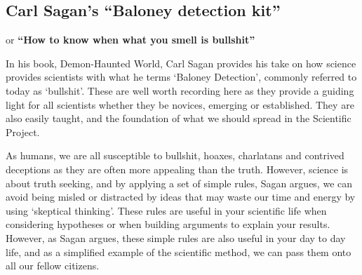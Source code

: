 \documentclass[
]{krantz}
\begin{document}
\hypertarget{carl-sagans-baloney-detection-kit}{%
\subsection{Carl Sagan's ``Baloney detection kit''}\label{carl-sagans-baloney-detection-kit}}

or \textbf{``How to know when what you smell is bullshit''}

In his book, Demon-Haunted World, Carl Sagan \citeyearpar{sagan2011demon} provides his take on how science provides scientists with what he terms `Baloney Detection', commonly referred to today as `bullshit'. These are well worth recording here as they provide a guiding light for all scientists whether they be novices, emerging or established. They are also easily taught, and the foundation of what we should spread in the Scientific Project.

As humans, we are all susceptible to bullshit, hoaxes, charlatans and contrived deceptions as they are often more appealing than the truth. However, science is about truth seeking, and by applying a set of simple rules, Sagan argues, we can avoid being misled or distracted by ideas that may waste our time and energy by using `skeptical thinking'. These rules are useful in your scientific life when considering hypotheses or when building arguments to explain your results. However, as Sagan argues, these simple rules are also useful in your day to day life, and as a simplified example of the scientific method, we can pass them onto all our fellow citizens.
\end{document}
